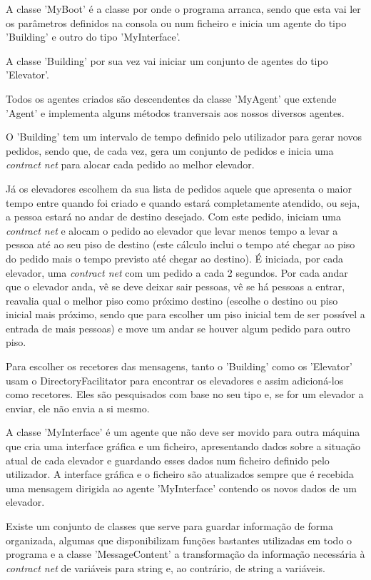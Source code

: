 \documentclass[a4paper]{article}
\begin{document}
A classe 'MyBoot' é a classe por onde o programa arranca, sendo que esta vai ler os parâmetros definidos na consola ou num ficheiro e inicia um agente do tipo 'Building' e outro do tipo 'MyInterface'.

A classe 'Building' por sua vez vai iniciar um conjunto de agentes do tipo 'Elevator'.

Todos os agentes criados são descendentes da classe 'MyAgent' que extende 'Agent' e implementa alguns métodos tranversais aos nossos diversos agentes.

O 'Building' tem um intervalo de tempo definido pelo utilizador para gerar novos pedidos, sendo que, de cada vez, gera um conjunto de pedidos e inicia uma \textit{contract net} para alocar cada pedido ao melhor elevador.

Já os elevadores escolhem da sua lista de pedidos aquele que apresenta o maior tempo entre quando foi criado e quando estará completamente atendido, ou seja, a pessoa estará no andar de destino desejado. Com este pedido, iniciam uma \textit{contract net} e alocam o pedido ao elevador que levar menos tempo a levar a pessoa até ao seu piso de destino (este cálculo inclui o tempo até chegar ao piso do pedido mais o tempo previsto até chegar ao destino). É iniciada, por cada elevador, uma \textit{contract net} com um pedido a cada 2 segundos. Por cada andar que o elevador anda, vê se deve deixar sair pessoas, vê se há pessoas a entrar, reavalia qual o melhor piso como próximo destino (escolhe o destino ou piso inicial mais próximo, sendo que para escolher um piso inicial tem de ser possível a entrada de mais pessoas) e move um andar se houver algum pedido para outro piso.

Para escolher os recetores das mensagens, tanto o 'Building' como os 'Elevator' usam o DirectoryFacilitator para encontrar os elevadores e assim adicioná-los como recetores. Eles são pesquisados com base no seu tipo e, se for um elevador a enviar, ele não envia a si mesmo.

A classe 'MyInterface' é um agente que não deve ser movido para outra máquina que cria uma interface gráfica e um ficheiro, apresentando dados sobre a situação atual de cada elevador e guardando esses dados num ficheiro definido pelo utilizador. A interface gráfica e o ficheiro são atualizados sempre que é recebida uma mensagem dirigida ao agente 'MyInterface' contendo os novos dados de um elevador.

Existe um conjunto de classes que serve para guardar informação de forma organizada, algumas que disponibilizam funções bastantes utilizadas em todo o programa e a classe 'MessageContent' a transformação da informação necessária à \textit{contract net} de variáveis para string e, ao contrário, de string a variáveis.
\end{document}

